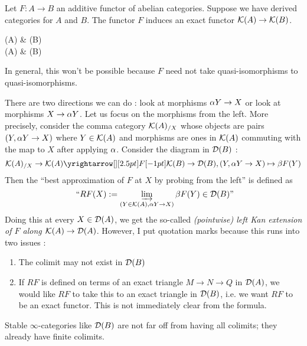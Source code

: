 \documentclass{article}
\begin{document}
Let $F : A \to B$ an additive functor of abelian categories.
Suppose we have derived categories for $A$ and $B$.
The functor $F$ induces an exact functor $\mathcal{K}(A) \to \mathcal{K}(B)$.
\begin{center}
\end{center}
\begin{cd}
  {(A)} & {(B)} \\
	{(A)} & {(B)}
	\arrow["F", from=1-1, to=1-2]
	\arrow[from=1-1, to=2-1, "{\al}"]
	\arrow[from=1-2, to=2-2, "{\be}"]
	\arrow["{?}", dashed, from=2-1, to=2-2]
\end{cd}
In general, this won't be possible because
$F$ need not take quasi-isomorphisms to quasi-isomorphisms.
\begin{center}
\end{center}
There are two directions we can do : look at morphisms $\alpha Y \to X$
or look at morphisms $X \to \alpha Y$.
Let us focus on the morphisms from the left.
More precisely, consider the comma category $\mathcal{K}(A)_{/ X}$
whose objects are pairs $(Y , \alpha Y \to X)$ where $Y \in \mathcal{K}(A)$
and morphisms are ones in $\mathcal{K}(A)$ commuting with
the map to $X$ after applying $\alpha$.
Consider the diagram in $\mathcal{D}(B)$ : 
\[
  \cK(A)_{/X} \to \cK(A) \map{F}{} \cK(B) \to \cD(B) , 
  (Y , \al Y \to X) \mapsto \be F(Y)
\]
Then the ``best approximation of $F$ at $X$ by probing from the left'' 
is defined as
\[
  \text{ ``$RF(X) := \varinjlim_{(Y \in \mathcal{K}(A) , \alpha Y \to X)} \beta F(Y) \in \mathcal{D}(B)$''}
\]
Doing this at every $X \in \mathcal{D}(A)$, 
we get the so-called \emph{(pointwise) 
  left Kan extension of $F$ along $\mathcal{K}(A) \to \mathcal{D}(A)$}.\cite[
    \href{https://kerodon.net/tag/0300}{Tag 0300}
    ]{kerodon}
However, I put quotation marks because this runs into two issues : 
\begin{enumerate}
  \item The colimit may not exist in $\mathcal{D}(B)$
  \item If $RF$ is defined
  on terms of an exact triangle $M \to N \to Q$ in $\mathcal{D}(A)$,
  we would like $RF$ to take this to an exact triangle in $\mathcal{D}(B)$,
  i.e. we want $RF$ to be an exact functor.
  This is not immediately clear from the formula.
\end{enumerate}
Stable $\infty$-categories like $\mathcal{D}(B)$ are not far off
from having all colimits; they already have finite colimits.
\end{document}
